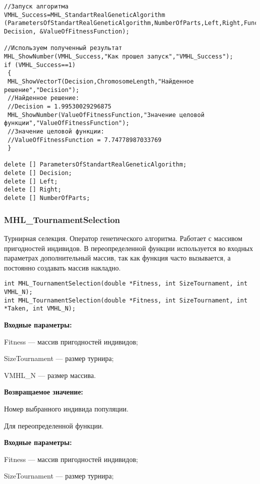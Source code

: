 \documentclass[a4paper,12pt]{article}
\begin{document}
\begin{lstlisting}[label=code_use_MHL_StandartRealGeneticAlgorithm,caption=Пример использования]
//Запуск алгоритма
VMHL_Success=MHL_StandartRealGeneticAlgorithm (ParametersOfStandartRealGeneticAlgorithm,NumberOfParts,Left,Right,Func2, Decision, &ValueOfFitnessFunction);

//Используем полученный результат
MHL_ShowNumber(VMHL_Success,"Как прошел запуск","VMHL_Success");
if (VMHL_Success==1)
 {
 MHL_ShowVectorT(Decision,ChromosomeLength,"Найденное решение","Decision");
 //Найденное решение:
 //Decision = 1.99530029296875
 MHL_ShowNumber(ValueOfFitnessFunction,"Значение целовой функции","ValueOfFitnessFunction");
 //Значение целовой функции:
 //ValueOfFitnessFunction = 7.74778987033769
 }

delete [] ParametersOfStandartRealGeneticAlgorithm;
delete [] Decision;
delete [] Left;
delete [] Right;
delete [] NumberOfParts;
\end{lstlisting}

\subsubsection{MHL\_TournamentSelection}\label{MHL_TournamentSelection}

Турнирная селекция. Оператор генетического алгоритма. Работает с массивом пригодностей индивидов. В переопределенной функции используется во входных параметрах дополнительный массив, так как функция часто вызывается, а постоянно создавать массив накладно.


\begin{lstlisting}[label=code_syntax_MHL_TournamentSelection,caption=Синтаксис]
int MHL_TournamentSelection(double *Fitness, int SizeTournament, int VMHL_N);
int MHL_TournamentSelection(double *Fitness, int SizeTournament, int *Taken, int VMHL_N);
\end{lstlisting}

\textbf{Входные параметры:}
 
 Fitness --- массив пригодностей индивидов;
 
 SizeTournament --- размер турнира;
 
 VMHL\_N --- размер массива.

\textbf{Возвращаемое значение:} 

 Номер выбранного индивида популяции.

 Для переопределенной функции.
 
 \textbf{Входные параметры:}
 
 Fitness --- массив пригодностей индивидов;
 
 SizeTournament --- размер турнира;
 
\end{document}
